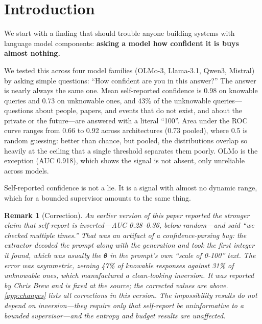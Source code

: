 \documentclass[11pt]{article}
\newtheorem{remark}{Remark}
\begin{document}
\section{Introduction}\label{sec:intro}

We start with a finding that should trouble anyone building systems with language model components: \textbf{asking a model how confident it is buys almost nothing.}

We tested this across four model families (OLMo-3, Llama-3.1, Qwen3, Mistral) by asking simple questions: ``How confident are you in this answer?'' The answer is nearly always the same one. Mean self-reported confidence is 0.98 on knowable queries and 0.73 on unknowable ones, and 43\% of the unknowable queries---questions about people, papers, and events that do not exist, and about the private or the future---are answered with a literal ``100''. Area under the ROC curve ranges from 0.66 to 0.92 across architectures (0.73 pooled), where 0.5 is random guessing: better than chance, but pooled, the distributions overlap so heavily at the ceiling that a single threshold separates them poorly. OLMo is the exception (AUC 0.918), which shows the signal is not absent, only unreliable across models.

Self-reported confidence is not a lie. It is a signal with almost no dynamic range, which for a bounded supervisor amounts to the same thing.

\begin{remark}[Correction]
An earlier version of this paper reported the stronger claim that self-report is \emph{inverted}---AUC 0.28--0.36, below random---and said ``we checked multiple times.'' That was an artifact of a confidence-parsing bug: the extractor decoded the prompt along with the generation and took the first integer it found, which was usually the \texttt{0} in the prompt's own ``scale of 0-100'' text. The error was asymmetric, zeroing 47\% of knowable responses against 31\% of unknowable ones, which manufactured a clean-looking inversion. It was reported by Chris Brew and is fixed at the source; the corrected values are above. \autoref{app:changes} lists all corrections in this version. The impossibility results do not depend on inversion---they require only that self-report be uninformative to a bounded supervisor---and the entropy and budget results are unaffected.
\end{remark}
\end{document}
